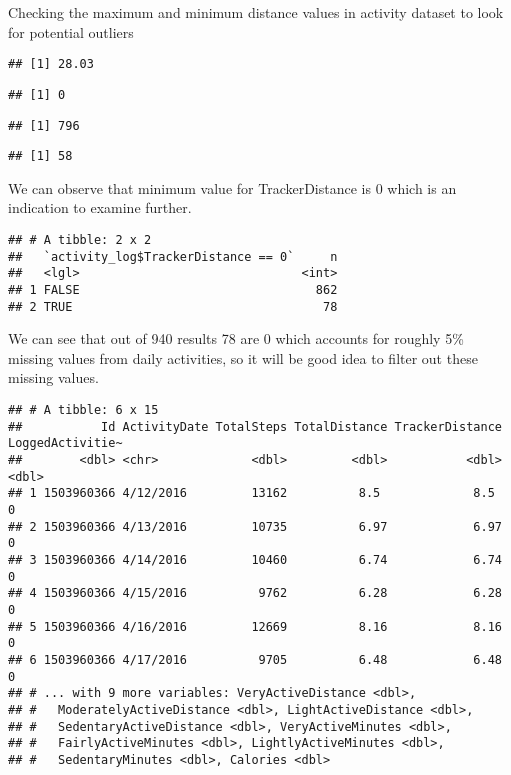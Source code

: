 \documentclass[
]{article}
\begin{document}
Checking the maximum and minimum distance values in activity dataset to
look for potential outliers

\begin{verbatim}
## [1] 28.03
\end{verbatim}

\begin{verbatim}
## [1] 0
\end{verbatim}

\begin{verbatim}
## [1] 796
\end{verbatim}

\begin{verbatim}
## [1] 58
\end{verbatim}

We can observe that minimum value for TrackerDistance is 0 which is an
indication to examine further.

\begin{verbatim}
## # A tibble: 2 x 2
##   `activity_log$TrackerDistance == 0`     n
##   <lgl>                               <int>
## 1 FALSE                                 862
## 2 TRUE                                   78
\end{verbatim}

We can see that out of 940 results 78 are 0 which accounts for roughly
5\% missing values from daily activities, so it will be good idea to
filter out these missing values.

\begin{verbatim}
## # A tibble: 6 x 15
##           Id ActivityDate TotalSteps TotalDistance TrackerDistance LoggedActivitie~
##        <dbl> <chr>             <dbl>         <dbl>           <dbl>            <dbl>
## 1 1503960366 4/12/2016         13162          8.5             8.5                 0
## 2 1503960366 4/13/2016         10735          6.97            6.97                0
## 3 1503960366 4/14/2016         10460          6.74            6.74                0
## 4 1503960366 4/15/2016          9762          6.28            6.28                0
## 5 1503960366 4/16/2016         12669          8.16            8.16                0
## 6 1503960366 4/17/2016          9705          6.48            6.48                0
## # ... with 9 more variables: VeryActiveDistance <dbl>,
## #   ModeratelyActiveDistance <dbl>, LightActiveDistance <dbl>,
## #   SedentaryActiveDistance <dbl>, VeryActiveMinutes <dbl>,
## #   FairlyActiveMinutes <dbl>, LightlyActiveMinutes <dbl>,
## #   SedentaryMinutes <dbl>, Calories <dbl>
\end{verbatim}
\end{document}
